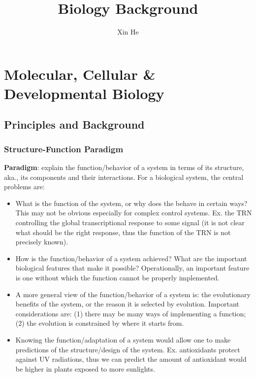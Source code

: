 \documentclass{report}
\title{Biology Background}
\author{Xin He}
\begin{document}
\tableofcontents
\setcounter{tocdepth}{1}
\chapter{Molecular, Cellular \& Developmental Biology}
\section{Principles and Background}

\subsection{Structure-Function Paradigm}

\textbf{Paradigm}: explain the function/behavior of a system in terms of its structure, aka., its components and their interactions. For a biological system, the central problems are: 
\begin{itemize}
	\item What is the function of the system, or why does the behave in certain ways? This may not be obvious especially for complex control systems. Ex. the TRN controlling the global transcriptional response to some signal (it is not clear what should be the right response, thus the function of the TRN is not precisely known). 
	\item How is the function/behavior of a system achieved? What are the important biological features that make it possible? Operationally, an important feature is one without which the function cannot be properly implemented. 
	\item A more general view of the function/behavior of a system is: the evolutionary benefits of the system, or the reason it is selected by evolution. Important considerations are: (1) there may be many ways of implementing a function; (2) the evolution is constrained by where it starts from. 
	\item Knowing the function/adaptation of a system would allow one to make predictions of the structure/design of the system. Ex. antioxidants protect against UV radiations, thus we can predict the amount of antioxidant would be higher in plants exposed to more sunlights. 
\end{itemize}
\end{document}
